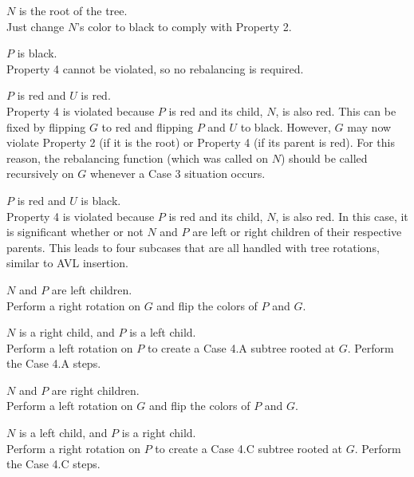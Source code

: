 \vspace{4mm}
\begin{description}[1cm]
    \item[\underline{Case 1}:] $N$ is the root of the tree. \\ 
    Just change $N$'s color to black to comply with Property 2.
    
    \item[\underline{Case 2}:] $P$ is black. \\ 
    Property 4 cannot be violated, so no rebalancing is required.
    
    \item[\underline{Case 3}:] $P$ is red and $U$ is red. \\ 
    Property 4 is violated because $P$ is red and its child, $N$, is also red. This can be fixed by flipping $G$ to red and flipping $P$ and $U$ to black. However, $G$ may now violate Property 2 (if it is the root) or Property 4 (if its parent is red). For this reason, the rebalancing function (which was called on $N$) should be called recursively on $G$ whenever a Case 3 situation occurs.
    
    \item[\underline{Case 4}:] $P$ is red and $U$ is black. \\ 
    Property 4 is violated because $P$ is red and its child, $N$, is also red. In this case, it is significant whether or not $N$ and $P$ are left or right children of their respective parents. This leads to four subcases that are all handled with tree rotations, similar to AVL insertion.
    
    \begin{description}[1cm]
        \item[\underline{Case 4.A}:] $N$ and $P$ are left children. \\
        Perform a right rotation on $G$ and flip the colors of $P$ and $G$.
        
        \item[\underline{Case 4.B}:] $N$ is a right child, and $P$ is a left child. \\
        Perform a left rotation on $P$ to create a Case 4.A subtree rooted at $G$. Perform the Case 4.A steps.
        
        \item[\underline{Case 4.C}:] $N$ and $P$ are right children. \\
        Perform a left rotation on $G$ and flip the colors of $P$ and $G$.
        
        \item[\underline{Case 4.D}:] $N$ is a left child, and $P$ is a right child. \\
        Perform a right rotation on $P$ to create a Case 4.C subtree rooted at $G$. Perform the Case 4.C steps.
    \end{description}
\end{description}
\vspace{4mm}

